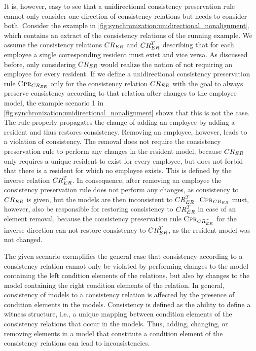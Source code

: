 It is, however, easy to see that a unidirectional consistency preservation rule cannot only consider one direction of consistency relations but needs to consider both.
Consider the example in \autoref{fig:synchronization:unidirectional_nonalignment}, which contains an extract of the consistency relations of the running example.
We assume the consistency relations $\consistencyrelation{CR}{ER}$ and $\consistencyrelation{CR}{ER}^T$ describing that for each employee a single corresponding resident must exist and vice versa.
As discussed before, only considering $\consistencyrelation{CR}{ER}$ would realize the notion of not requiring an employee for every resident.
If we define a unidirectional consistency preservation rule $\consistencypreservationrule{\consistencyrelation{CR}{ER}}$ only for the consistency relation $\consistencyrelation{CR}{ER}$ with the goal to always preserve consistency according to that relation after changes to the employee model, the example scenario 1 in \autoref{fig:synchronization:unidirectional_nonalignment} shows that this is not the case.
The rule properly propagates the change of adding an employee by adding a resident and thus restores consistency.
Removing an employee, however, leads to a violation of consistency.
The removal does not require the consistency preservation rule to perform any changes in the resident model, because $\consistencyrelation{CR}{ER}$ only requires a unique resident to exist for every employee, but does not forbid that there is a resident for which no employee exists.
This is defined by the inverse relation $\consistencyrelation{CR}{ER}^T$.
In consequence, after removing an employee the consistency preservation rule does not perform any changes, as consistency to $\consistencyrelation{CR}{ER}$ is given, but the models are then inconsistent to $\consistencyrelation{CR}{ER}^T$.
$\consistencypreservationrule{\consistencyrelation{CR}{ER}}$ must, however, also be responsible for restoring consistency to $\consistencyrelation{CR}{ER}^T$ in case of an element removal, because the consistency preservation rule $\consistencypreservationrule{\consistencyrelation{CR}{ER}^T}$ for the inverse direction can not restore consistency to $\consistencyrelation{CR}{ER}^T$, as the resident model was not changed.

The given scenario exemplifies the general case that consistency according to a consistency relation cannot only be violated by performing changes to the model containing the left condition elements of the relations, but also by changes to the model containing the right condition elements of the relation.
In general, consistency of models to a consistency relation is affected by the presence of condition elements in the models.
Consistency is defined as the ability to define a witness structure, i.e., a unique mapping between condition elements of the consistency relations that occur in the models.
Thus, adding, changing, or removing elements in a model that constitute a condition element of the consistency relations can lead to inconsistencies.

